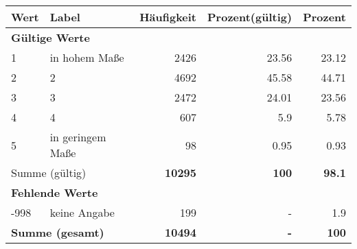      \begin{longtable}{lXrrr}
     \toprule
     \textbf{Wert} & \textbf{Label} & \textbf{Häufigkeit} & \textbf{Prozent(gültig)} & \textbf{Prozent} \\
     \endhead
     \midrule
     \multicolumn{5}{l}{\textbf{Gültige Werte}}\\

     1 &
     \multicolumn{1}{X}{ in hohem Maße   } &


       \num{2426} &
       \num[round-mode=places,round-precision=2]{23.56} &
         \num[round-mode=places,round-precision=2]{23.12} \\

     2 &
     \multicolumn{1}{X}{ 2   } &


       \num{4692} &
       \num[round-mode=places,round-precision=2]{45.58} &
         \num[round-mode=places,round-precision=2]{44.71} \\

     3 &
     \multicolumn{1}{X}{ 3   } &


       \num{2472} &
       \num[round-mode=places,round-precision=2]{24.01} &
         \num[round-mode=places,round-precision=2]{23.56} \\

     4 &
     \multicolumn{1}{X}{ 4   } &


       \num{607} &
       \num[round-mode=places,round-precision=2]{5.9} &
         \num[round-mode=places,round-precision=2]{5.78} \\

     5 &
     \multicolumn{1}{X}{ in geringem Maße   } &


       \num{98} &
       \num[round-mode=places,round-precision=2]{0.95} &
         \num[round-mode=places,round-precision=2]{0.93} \\
     \midrule
     \multicolumn{2}{l}{Summe (gültig)} &
       \textbf{\num{10295}} &
     \textbf{\num{100}} &
       \textbf{\num[round-mode=places,round-precision=2]{98.1}} \\
     \multicolumn{5}{l}{\textbf{Fehlende Werte}}\\
       -998 &
       keine Angabe &
         \num{199} &
        - &
         \num[round-mode=places,round-precision=2]{1.9} \\
     \midrule
     \multicolumn{2}{l}{\textbf{Summe (gesamt)}} &
          \textbf{\num{10494}} &
        \textbf{-} &
        \textbf{\num{100}} \\
     \bottomrule
     \end{longtable}
     

